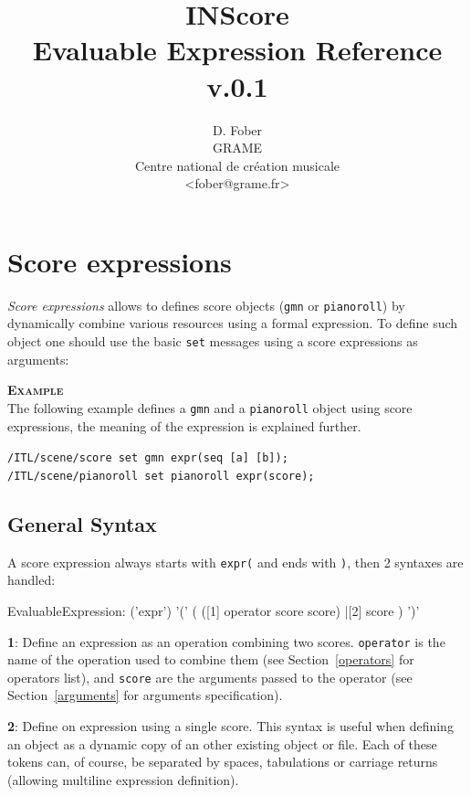 \documentclass[a4paper,twoside]{report}
\newcommand{\toplevel}[1]	{\chapter{#1}}
\newcommand{\sublevel}[1]	{\section{#1}}
\newcommand{\OSC}[1]		{\texttt{#1}}
\newcommand{\example}		{\textbf{\hspace{-1.5cm}\textbf{\textsc{Example }}}}
\let\olditemize\itemize
\let\oldenditemize\enditemize
\renewenvironment{itemize} 	{\olditemize \setlength{\itemsep}{1mm}}{\oldenditemize}
\newcommand{\sample}	[1]			{\vspace{-2mm}\begin{center}\colorbox{mygrey}{
								\begin{minipage}[t]{0.9\columnwidth} 
								{\small \texttt{#1}}
								\end{minipage}}\end{center}}
\begin{document}
\title{INScore \\ Evaluable Expression Reference \\v.0.1}

\author{D. Fober\\ GRAME\\ Centre national de cr\'eation musicale\\
{\small <fober@grame.fr>} \\
}

\maketitle


\tableofcontents

\pagestyle{plain}

\newpage

\setcounter{page}{1}

\toplevel{Score expressions}
\label{scoreExpr}

\emph{Score expressions} allows to defines score objects (\OSC{gmn} or \OSC{pianoroll}) by dynamically combine various resources using a formal expression. To define such object one should use the basic \OSC{set} messages using a score expressions as arguments:

\example\\
The following example defines a \OSC{gmn} and a \OSC{pianoroll} object using score expressions, the meaning of the expression is explained further.
\sample{/ITL/scene/score set gmn expr(seq [a] [b]); \\
/ITL/scene/pianoroll set pianoroll expr(score);}

\sublevel{General Syntax}

A score expression  always starts with \OSC{expr(} and ends with \OSC{)}, then 
2 syntaxes are handled:

\begin{rail}
EvaluableExpression: 	('expr')
						'('
						 (
						  ([1] operator score score)
						  |[2] score
						 )
						')'
\end{rail}

\begin{itemize}
\item \textbf{1}: Define an expression as an operation combining two scores. \OSC{operator} is the name of the operation used to combine them (see Section~\ref{operators} for operators list), and \OSC{score} are the arguments passed to  the operator (see Section~\ref{arguments} for arguments specification).
\item \textbf{2}: Define on expression using a single score. This syntax is useful when defining an object as a dynamic copy of an other existing object or file.
\end{itemize}
Each of these tokens can, of course, be separated by spaces, tabulations or carriage returns (allowing multiline expression definition).
\end{document}
